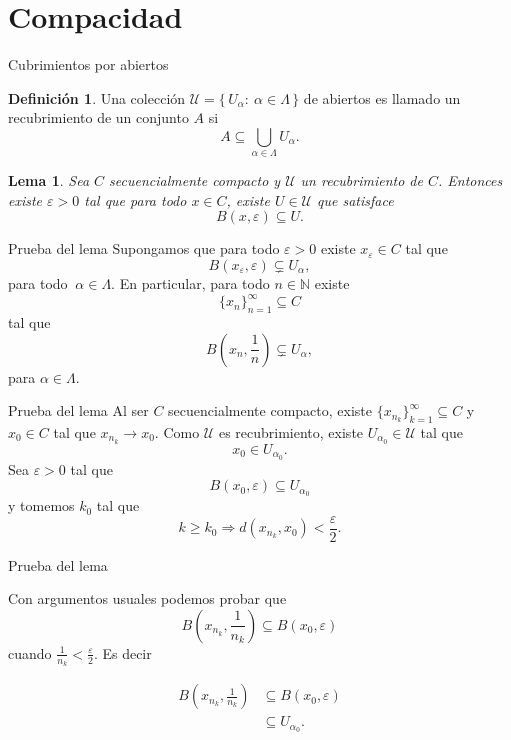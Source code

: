 \documentclass[utf8]{beamer}
\theoremstyle{plain}
\newtheorem{Lem}{Lema}                 %
\theoremstyle{definition}
\newtheorem{Def}{Definición}           %
\theoremstyle{remark}
\numberwithin{equation}{section}
\newcommand{\al}{\alpha}                %
\newcommand{\eps}{\varepsilon}          %
\newcommand{\La}{\Lambda}               %
\newcommand{\bN}{\mathbb{N}}    %
\newcommand{\cU}{\mathcal{U}}           %
\newcommand{\set}[1]{\{\,#1\,\}}    %
\renewcommand{\geq}{\geqslant}          %
\newcommand{\To}{\Rightarrow}
\begin{document}
\section{Compacidad}

\begin{frame}{Cubrimientos por abiertos}
  \begin{Def}\label{def:recubrimiento}
  Una colecci\'on $\cU=\set{U_\al:\ \al\in\La}$ de abiertos es llamado un \alert{recubrimiento} de un conjunto $A$ si 
  $$A\subseteq \bigcup_{\al\in\La}U_\al.$$
  \end{Def}
  \begin{Lem}\label{lem:lemaTecnico}
    Sea $C$  secuencialmente compacto y $\cU$  un recubrimiento de $C$. Entonces existe $\eps>0$ tal que para todo  $x\in C$, existe $U\in\cU$ 
    que satisface
    $$B(x,\eps) \subseteq U.$$
  \end{Lem}
\end{frame}

\begin{frame}{Prueba del lema}
  Supongamos que para todo $\eps>0$ existe $x_\eps\in C$ tal que 
  $$B(x_\eps,\eps)\subsetneq U_\al,$$
  para todo $\ \al\in \La.$ En particular, para todo $n \in\bN$  existe 
  $$\{x_n\}_{n=1}^\infty\subseteq C$$
  tal que 
  $$B\left(x_n,\frac1n\right)\subsetneq U_\al,$$
  para $\al\in \La$.
  
    
  
  

\end{frame}

\begin{frame}{Prueba del lema}
  Al ser $C$ secuencialmente compacto, existe $\{x_{n_k}\}_{k=1}^\infty\subseteq C$ y $x_0\in C$ tal que $x_{n_k}\to x_0$.
  Como $\cU$ es recubrimiento, existe $U_{\al_0} \in \cU$ tal que 
  $$x_0\in U_{\al_0}.$$ 
  Sea $\eps>0$ tal que 
  $$B(x_0,\eps)\subseteq U_{\al_0}$$ 
  y tomemos $k_0$ tal que 
  $$k\geq k_0\To d(x_{n_k},x_0)<\frac{\eps}{2}.$$
  
  
  \end{frame}

\begin{frame}{Prueba del lema}
  
  Con argumentos usuales podemos probar que 
  $$B\left(x_{n_k},\frac{1}{n_k}\right)\subseteq B(x_0,\eps)$$
  cuando 
  $\frac{1}{n_k}<\frac{\eps}{2}$. 
  Es decir
  
  \begin{align*}
    B\left(x_{n_k},\frac{1}{n_k}\right)&\subseteq B(x_0,\eps)\\
    &\subseteq U_{\al_0}.
  \end{align*}
    
      
   
\end{frame}
\end{document}
